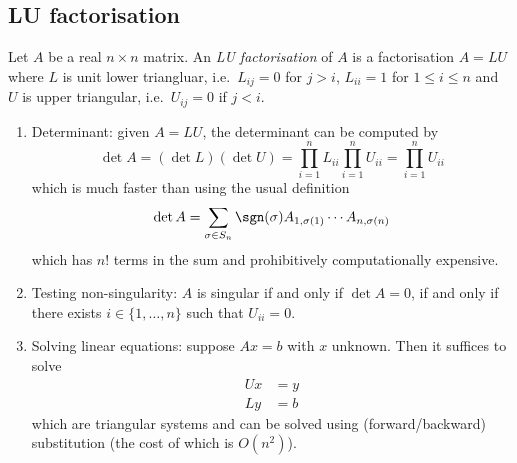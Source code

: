 \documentclass[a4paper]{article}
\begin{document}
\subsection{LU factorisation}

\begin{definition}[LU factorisation]
  Let \(A\) be a real \(n \times n\) matrix. An \emph{LU factorisation} of \(A\) is a factorisation \(A = LU\) where \(L\) is unit lower triangluar, i.e.\ \(L_{ij} = 0\) for \(j > i\), \(L_{ii} = 1\) for \(1 \leq i \leq n\) and \(U\) is upper triangular, i.e.\ \(U_{ij} = 0\) if \(j < i\).
\end{definition}

\begin{application}\leavevmode
  \begin{enumerate}
  \item Determinant: given \(A = LU\), the determinant can be computed by
    \[
      \det A = (\det L)(\det U) = \prod_{i = 1}^n L_{ii} \prod_{i = 1}^n U_{ii} = \prod_{i = 1}^n U_{ii}
    \]
    which is much faster than using the usual definition
    \[
      \det A = \sum_{\sigma \in S_n} \sgn(\sigma) A_{1, \sigma(1)} \cdots A_{n, \sigma(n)}
    \]
    which has \(n!\) terms in the sum and prohibitively computationally expensive.
  \item Testing non-singularity: \(A\) is singular if and only if \(\det A = 0\), if and only if there exists \(i \in \{1, \dots, n\}\) such that \(U_{ii} = 0\).
  \item Solving linear equations: suppose \(Ax = b\) with \(x\) unknown. Then it suffices to solve
    \begin{align*}
      Ux &= y \\
      Ly &= b
    \end{align*}
    which are triangular systems and can be solved using (forward/backward) substitution (the cost of which is \(O(n^2)\)).
  \end{enumerate}
\end{application}
\end{document}
